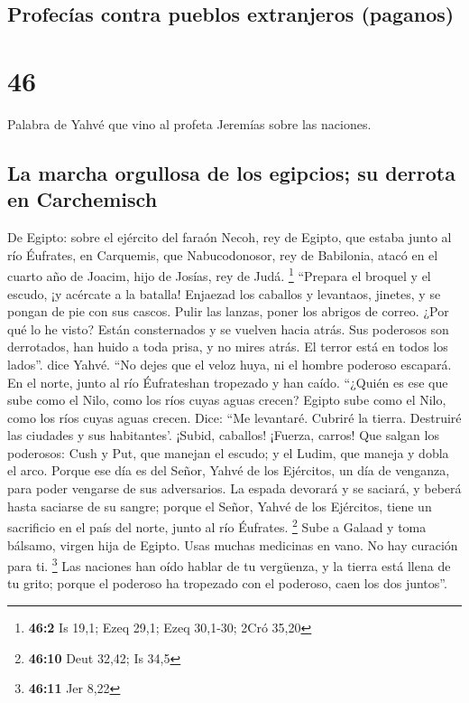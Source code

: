 \hypertarget{profecuxedas-contra-pueblos-extranjeros-paganos}{%
\subsection{Profecías contra pueblos extranjeros
(paganos)}\label{profecuxedas-contra-pueblos-extranjeros-paganos}}

\hypertarget{section-45}{%
\section{46}\label{section-45}}

 Palabra de Yahvé que vino al profeta Jeremías sobre las
naciones.

\hypertarget{la-marcha-orgullosa-de-los-egipcios-su-derrota-en-carchemisch}{%
\subsection{La marcha orgullosa de los egipcios; su derrota en
Carchemisch}\label{la-marcha-orgullosa-de-los-egipcios-su-derrota-en-carchemisch}}

 De Egipto: sobre el ejército del faraón Necoh, rey de
Egipto, que estaba junto al río Éufrates, en Carquemis, que
Nabucodonosor, rey de Babilonia, atacó en el cuarto año de Joacim, hijo
de Josías, rey de Judá. \footnote{\textbf{46:2} Is 19,1; Ezeq 29,1; Ezeq
  30,1-30; 2Cró 35,20}  ``Prepara el broquel y el escudo,
¡y acércate a la batalla!  Enjaezad los caballos y
levantaos, jinetes, y se pongan de pie con sus cascos. Pulir las lanzas,
poner los abrigos de correo.  ¿Por qué lo he visto? Están
consternados y se vuelven hacia atrás. Sus poderosos son derrotados, han
huido a toda prisa, y no mires atrás. El terror está en todos los
lados''. dice Yahvé.  ``No dejes que el veloz huya, ni el
hombre poderoso escapará. En el norte, junto al río Éufrateshan
tropezado y han caído.  ``¿Quién es ese que sube como el
Nilo, como los ríos cuyas aguas crecen?  Egipto sube como
el Nilo, como los ríos cuyas aguas crecen. Dice: ``Me levantaré. Cubriré
la tierra. Destruiré las ciudades y sus habitantes'. 
¡Subid, caballos! ¡Fuerza, carros! Que salgan los poderosos: Cush y Put,
que manejan el escudo; y el Ludim, que maneja y dobla el arco.
 Porque ese día es del Señor, Yahvé de los Ejércitos, un
día de venganza, para poder vengarse de sus adversarios. La espada
devorará y se saciará, y beberá hasta saciarse de su sangre; porque el
Señor, Yahvé de los Ejércitos, tiene un sacrificio en el país del norte,
junto al río Éufrates. \footnote{\textbf{46:10} Deut 32,42; Is 34,5}
 Sube a Galaad y toma bálsamo, virgen hija de Egipto.
Usas muchas medicinas en vano. No hay curación para ti. \footnote{\textbf{46:11}
  Jer 8,22}  Las naciones han oído hablar de tu
vergüenza, y la tierra está llena de tu grito; porque el poderoso ha
tropezado con el poderoso, caen los dos juntos''.

